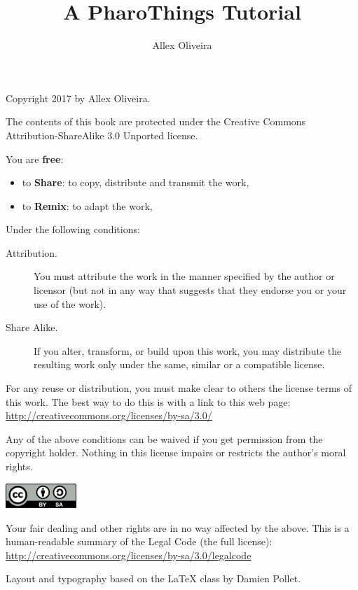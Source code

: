 \documentclass[10pt,twoside,english]{_support/latex/sbabook/sbabook}
\title{A PharoThings Tutorial}
\author{Allex Oliveira}
\begin{document}
\maketitle
\pagestyle{titlingpage}
\thispagestyle{titlingpage} %

\cleartoverso
{\small

  Copyright 2017 by Allex Oliveira.

  The contents of this book are protected under the Creative Commons
  Attribution-ShareAlike 3.0 Unported license.

  You are \textbf{free}:
  \begin{itemize}
  \item to \textbf{Share}: to copy, distribute and transmit the work,
  \item to \textbf{Remix}: to adapt the work,
  \end{itemize}

  Under the following conditions:
  \begin{description}
  \item[Attribution.] You must attribute the work in the manner specified by the
    author or licensor (but not in any way that suggests that they endorse you
    or your use of the work).
  \item[Share Alike.] If you alter, transform, or build upon this work, you may
    distribute the resulting work only under the same, similar or a compatible
    license.
  \end{description}

  For any reuse or distribution, you must make clear to others the
  license terms of this work. The best way to do this is with a link to
  this web page: \\
  \url{http://creativecommons.org/licenses/by-sa/3.0/}

  Any of the above conditions can be waived if you get permission from
  the copyright holder. Nothing in this license impairs or restricts the
  author's moral rights.

  \begin{center}
    \includegraphics[width=0.2\textwidth]{_support/latex/sbabook/CreativeCommons-BY-SA.pdf}
  \end{center}

  Your fair dealing and other rights are in no way affected by the
  above. This is a human-readable summary of the Legal Code (the full
  license): \\
  \url{http://creativecommons.org/licenses/by-sa/3.0/legalcode}

  \vfill

  Layout and typography based on the  \LaTeX{} class by Damien
  Pollet.
}
\end{document}
